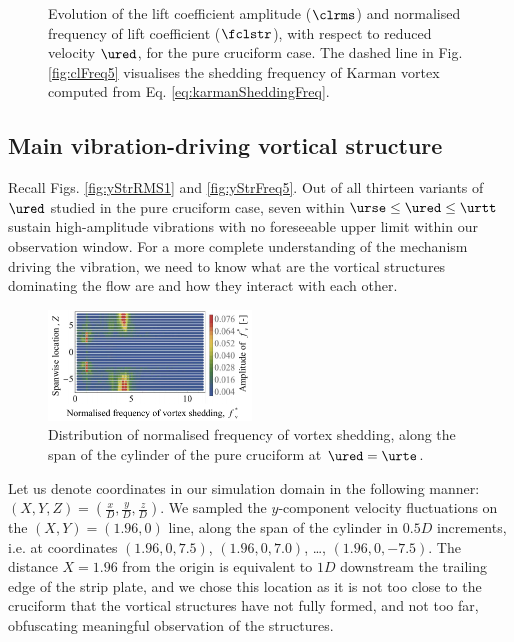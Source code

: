 \documentclass[a4paper,fleqn]{cas-sc}
\begin{document}
\begin{figure}
  \caption{Evolution of the lift coefficient \rms{} amplitude ($\clrms$) and normalised frequency of lift coefficient ($\fclstr$), with respect to reduced velocity $\ured$, for the pure cruciform case. The dashed line in Fig. \ref{fig:clFreq5} visualises the shedding frequency of Karman vortex computed from Eq. \ref{eq:karmanSheddingFreq}.} \label{fig:cl90}
\end{figure}

\subsection{Main vibration-driving vortical structure}\label{ssec:svivRegimeVortStruct}
Recall Figs. \ref{fig:yStrRMS1} and \ref{fig:yStrFreq5}. Out of all thirteen variants of $\ured$ studied in the pure cruciform case, seven within $\urse \leq \ured \leq \urtt$ sustain high-amplitude vibrations with no foreseeable upper limit within our observation window. For a more complete understanding of the mechanism driving the vibration, we need to know what are the vortical structures dominating the flow are and how they interact with each other.

\begin{figure}
  \centering
\includegraphics[width=0.48\textwidth]{figs/probe90YU10}
\caption{Distribution of normalised frequency of vortex shedding, along the span of the cylinder of the pure cruciform at $\ured = \urte$.}
  \label{fig:probe90YU10}
\end{figure}

Let us denote coordinates in our simulation domain in the following manner: $\left( X, Y, Z \right) = \left( \frac{x}{D}, \frac{y}{D}, \frac{z}{D} \right)$. We sampled the $y$-component velocity fluctuations on the $\left ( X, Y \right ) = \left ( 1.96, 0 \right )$ line, along the span of the cylinder in $0.5D$ increments, i.e. at coordinates $\left ( 1.96, 0, 7.5 \right )$, $\left ( 1.96, 0, 7.0 \right )$, \dots, $\left ( 1.96, 0, -7.5 \right )$. The distance $X = 1.96$ from the origin is equivalent to $1D$ downstream the trailing edge of the strip plate, and we chose this location as it is not too close to the cruciform that the vortical structures have not fully formed, and not too far, obfuscating meaningful observation of the structures.
\end{document}

